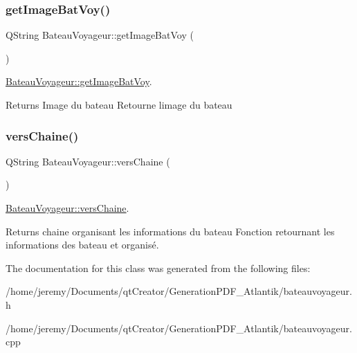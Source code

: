 \subsubsection{\texorpdfstring{get\+Image\+Bat\+Voy()}{getImageBatVoy()}}
{\footnotesize\ttfamily Q\+String Bateau\+Voyageur\+::get\+Image\+Bat\+Voy (\begin{DoxyParamCaption}{ }\end{DoxyParamCaption})}



\hyperlink{class_bateau_voyageur_a3154786b2f572d0c2a2ac975757295eb}{Bateau\+Voyageur\+::get\+Image\+Bat\+Voy}. 

\begin{DoxyReturn}{Returns}
Image du bateau Retourne l\textquotesingle{}image du bateau 
\end{DoxyReturn}
\mbox{\label{class_bateau_voyageur_a3fa14cf7db3a1a35457f1e0450d7e8b2}} 
\subsubsection{\texorpdfstring{vers\+Chaine()}{versChaine()}}
{\footnotesize\ttfamily Q\+String Bateau\+Voyageur\+::vers\+Chaine (\begin{DoxyParamCaption}{ }\end{DoxyParamCaption})}



\hyperlink{class_bateau_voyageur_a3fa14cf7db3a1a35457f1e0450d7e8b2}{Bateau\+Voyageur\+::vers\+Chaine}. 

\begin{DoxyReturn}{Returns}
chaine organisant les informations du bateau Fonction retournant les informations des bateau et organisé. 
\end{DoxyReturn}


The documentation for this class was generated from the following files\+:\begin{DoxyCompactItemize}
\item 
/home/jeremy/\+Documents/qt\+Creator/\+Generation\+P\+D\+F\+\_\+\+Atlantik/bateauvoyageur.\+h\item 
/home/jeremy/\+Documents/qt\+Creator/\+Generation\+P\+D\+F\+\_\+\+Atlantik/bateauvoyageur.\+cpp\end{DoxyCompactItemize}
